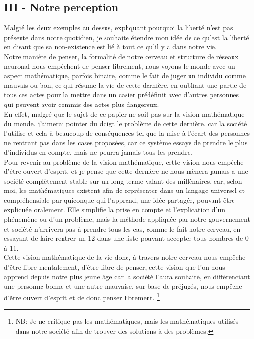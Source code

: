\documentclass[twocolumn, french]{article}
\begin{document}
\subsection*{III - Notre perception}
Malgré les deux exemples au dessus, expliquant pourquoi la liberté n'est pas présente dans notre
quotidien, je souhaite étendre mon idée de ce qu'est la liberté en disant que sa non-existence 
est lié à tout ce qu'il y a dans notre vie. \\ Notre manière de penser, la formalité de notre 
cerveau et structure de réseaux neuronal nous empêchent de penser librement, nous voyons le 
monde avec un aspect mathématique, parfois binaire, comme le fait de juger un individu comme 
mauvais ou bon, ce qui résume la vie de cette dernière, en oubliant une partie de tous ces actes
pour la mettre dans un casier prédéfinit avec d'autres personnes qui peuvent avoir commis des
actes plus dangereux. \\ En effet, malgré que le sujet de ce papier ne soit pas sur la vision 
mathématique du monde, j'aimerai pointer du doigt le problème de cette dernière, car la société 
l'utilise et cela à beaucoup de conséquences tel que la mise à l'écart des personnes ne rentrant
pas dans les cases proposées, car ce système essaye de prendre le plus d'individus en compte, mais 
ne pourra jamais tous les prendre. \\ Pour revenir au problème de la vision mathématique, cette 
vision nous empêche d'être ouvert d'esprit, et je pense que cette dernière ne nous mènera jamais
à une société complètement stable sur un long terme valant des millénaires, car, selon-moi, les 
mathématiques existent afin de représenter dans un langage universel et compréhensible par quiconque 
qui l'apprend, une idée partagée, pouvant être expliquée oralement. Elle simplifie la prise en compte 
et l'explication d'un phénomène ou d'un problème, mais la méthode appliquée par notre gouvernement 
et société n'arrivera pas à prendre tous les cas, comme le fait notre cerveau, en essayant de faire 
rentrer un 12 dans une liste pouvant accepter tous nombres de 0 à 11. \\
Cette vision mathématique de la vie donc, à travers notre cerveau nous empêche d'être libre 
mentalement, d'être libre de penser, cette vision que l'on nous apprend depuis notre plus 
jeune âge car la société l'aura souhaité, en différenciant une personne bonne et une autre
mauvaise, sur base de préjugés, nous empêche d'être ouvert d'esprit et de donc penser 
librement.
\footnote{ 
  NB: Je ne critique pas les mathématiques, mais les mathématiques utilisés dans notre société
  afin de trouver des solutions à des problèmes.
}
\end{document}

